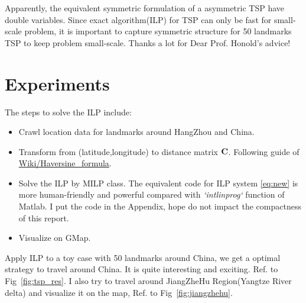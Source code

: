 \documentclass{mcmthesis}
\begin{document}
Apparently, the equivalent symmetric formulation of a asymmetric TSP have double variables. Since  exact algorithm(ILP) for TSP can only  be fast for small-scale problem, it is important to capture symmetric structure for 50 landmarks TSP to keep problem small-scale. Thanks a lot for Dear Prof. Honold's advice!
\section{Experiments}

The steps to solve the ILP include: 
\begin{itemize}[noitemsep,nolistsep]
	\item Crawl location data for landmarks around HangZhou and China. 
	\item Transform from (latitude,longitude)  to distance matrix $\mathbf{C}$. Following guide of \href{https://en.wikipedia.org/wiki/Haversine_formula}{Wiki/Haversine\_formula}\cite{bib:wiki}. 
	\item Solve the ILP by MILP class. The equivalent code for ILP system \eqref{eq:new} is more human-friendly and powerful compared with \textit{`intlinprog`} function of Matlab.  
	I put the code in the Appendix, hope do not impact the compactness of this report.
	\item Visualize on GMap. 
\end{itemize}
%

Apply ILP to a toy case with 50 landmarks around China, we get a optimal strategy to travel around China. It is quite interesting and exciting. Ref. to Fig~\vref{fig:tsp_res}.   I also try to travel around JiangZheHu Region(Yangtze River delta) and visualize it on the map, Ref. to Fig~\vref{fig:jiangzhehu}. 
\end{document}

